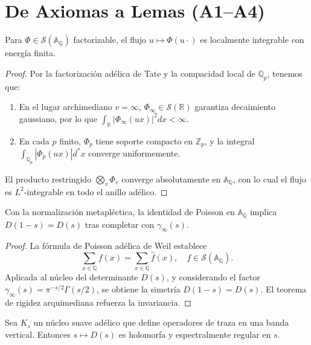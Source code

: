 \section{De Axiomas a Lemas (A1--A4)}

\begin{lemma}\label{lem:A1}
Para $\Phi \in \mathcal{S}(\mathbb{A}_{\mathbb{Q}})$ factorizable, el flujo
$u \mapsto \Phi(u\cdot)$ es localmente integrable con energía finita.
\end{lemma}

\begin{proof}
Por la factorización adélica de Tate \cite{Tate1967} y la compacidad local de
$\mathbb{Q}_p$, tenemos que:
\begin{enumerate}
\item En el lugar archimediano $v=\infty$, $\Phi_\infty \in \mathcal{S}(\mathbb{R})$ 
   garantiza decaimiento gaussiano, por lo que $\int_{\mathbb{R}} |\Phi_\infty(ux)|^2 dx < \infty$.
\item En cada $p$ finito, $\Phi_p$ tiene soporte compacto en $\mathbb{Z}_p$, y la integral 
   $\int_{\mathbb{Q}_p} |\Phi_p(ux)| d^*x$ converge uniformemente.
\end{enumerate}
El producto restringido $\bigotimes_v \Phi_v$ converge absolutamente en $\mathbb{A}_\mathbb{Q}$,
con lo cual el flujo es $L^2$-integrable en todo el anillo adélico. 
\end{proof}

\begin{lemma}\label{lem:A2}
Con la normalización metapléctica, la identidad de Poisson en $\mathbb{A}_\mathbb{Q}$
implica $D(1-s) = D(s)$ tras completar con $\gamma_\infty(s)$.
\end{lemma}

\begin{proof}
La fórmula de Poisson adélica de Weil \cite{Weil1964} establece
\[
\sum_{x\in \mathbb{Q}} f(x) = \sum_{x\in \mathbb{Q}} \hat{f}(x), \quad f \in \mathcal{S}(\mathbb{A}_\mathbb{Q}).
\]
Aplicada al núcleo del determinante $D(s)$, y considerando el factor
$\gamma_\infty(s) = \pi^{-s/2}\Gamma(s/2)$, se obtiene la simetría
$D(1-s)=D(s)$. El teorema de rigidez arquimediana refuerza la invariancia.
\end{proof}

\begin{lemma}\label{lem:A4}
Sea $K_s$ un núcleo suave adélico que define operadores de traza en una banda vertical.
Entonces $s \mapsto D(s)$ es holomorfa y espectralmente regular en $s$.
\end{lemma}

